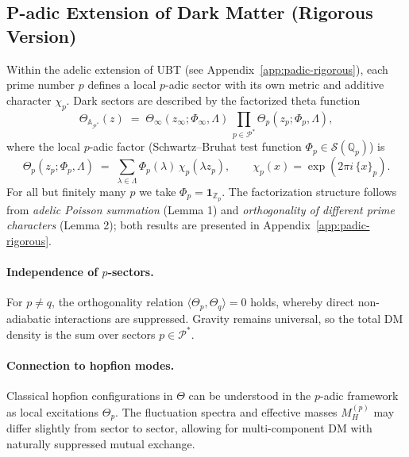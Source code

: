 \subsection{P-adic Extension of Dark Matter (Rigorous Version)}
Within the adelic extension of UBT (see Appendix~\ref{app:padic-rigorous}), each prime number $p$ defines a local $p$-adic sector
with its own metric and additive character $\chi_p$. Dark sectors are described by the factorized theta function
\begin{equation}
\Theta_{\mathbb{A}_{\mathcal{P}^\ast}}(z) \;=\; \Theta_\infty(z_\infty;\Phi_\infty,\Lambda)\,\prod_{p\in\mathcal{P}^\ast}\Theta_p(z_p;\Phi_p,\Lambda),
\end{equation}
where the local $p$-adic factor (Schwartz--Bruhat test function $\Phi_p\in\mathcal{S}(\mathbb{Q}_p)$) is
\begin{equation}
\Theta_p(z_p;\Phi_p,\Lambda) \;=\; \sum_{\lambda\in\Lambda} \Phi_p(\lambda)\,\chi_p(\lambda z_p),\qquad
\chi_p(x)=\exp(2\pi i\,\{x\}_p).
\end{equation}
For all but finitely many $p$ we take $\Phi_p=\mathbf{1}_{\mathbb{Z}_p}$. The factorization structure follows from \emph{adelic Poisson summation} (Lemma 1)
and \emph{orthogonality of different prime characters} (Lemma 2); both results are presented in Appendix~\ref{app:padic-rigorous}.

\paragraph{Independence of $p$-sectors.}
For $p\neq q$, the orthogonality relation $\langle \Theta_p,\Theta_q\rangle=0$ holds, whereby direct non-adiabatic interactions are suppressed.
Gravity remains universal, so the total DM density is the sum over sectors $p\in\mathcal{P}^\ast$.

\paragraph{Connection to hopfion modes.}
Classical hopfion configurations in $\Theta$ can be understood in the $p$-adic framework as local excitations $\Theta_p$.
The fluctuation spectra and effective masses $M_H^{(p)}$ may differ slightly from sector to sector, allowing for multi-component DM with naturally suppressed mutual exchange.

